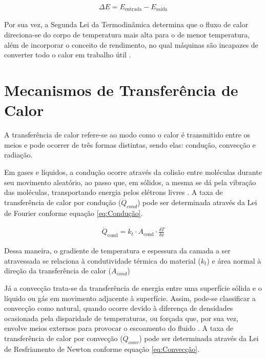 \documentclass[acronym,symbols]{fei}
\begin{document}
\begin{equation}
    \begin{aligned}
    \Delta E = E_{\text{entrada}} - E_{\text{saída}}
    \end{aligned}
\end{equation}


Por sua vez, a Segunda Lei da Termodinâmica determina que o fluxo de calor direciona-se do corpo de temperatura mais alta para o de menor temperatura, além de incorporar o conceito de rendimento, no qual máquinas são incapazes de converter todo o calor em trabalho útil \cite{nussenzveig2018curso}.

\section{Mecanismos de Transferência de Calor} 
A transferência de calor refere-se ao modo como o calor é transmitido entre os meios e pode ocorrer de três formas distintas, sendo elas: condução, convecção e radiação.

Em gases e líquidos, a condução ocorre através da colisão entre moléculas durante seu movimento aleatório, ao passo que, em sólidos, a mesma se dá pela vibração das moléculas, transportando energia pelos elétrons livres \cite{ccengel2006termodinamica}. A taxa de transferência de calor por condução ($\dot{Q}_{cond}$) pode ser determinada através da Lei de Fourier conforme equação \ref{eq:Condução}.

\begin{equation} \label{eq:Condução}
\begin{aligned}
    \dot{Q}_{\text{cond}} = k_{t} \cdot A_{\text{cond}} \cdot \frac{\delta T}{\delta x}
\end{aligned}
\end{equation}

Dessa maneira, o gradiente de temperatura e espessura da camada a ser atravessada se relaciona à condutividade térmica do material ($k_{t}$) e área normal à direção da transferência de calor ($A_{cond}$)

Já a convecção trata-se da transferência de energia entre uma superfície sólida e o líquido ou gás em movimento adjacente à superfície. Assim, pode-se classificar a convecção como natural, quando ocorre devido à diferença de densidades ocasionada pela disparidade de temperaturas, ou forçada que, por sua vez, envolve meios externos para provocar o escoamento do fluido \cite{ccengel2006termodinamica}. A taxa de transferência de calor por convecção ($\dot{Q}_{conv}$) pode ser determinada através da Lei de Resfriamento de Newton conforme equação \ref{eq:Convecção}.
\end{document}
